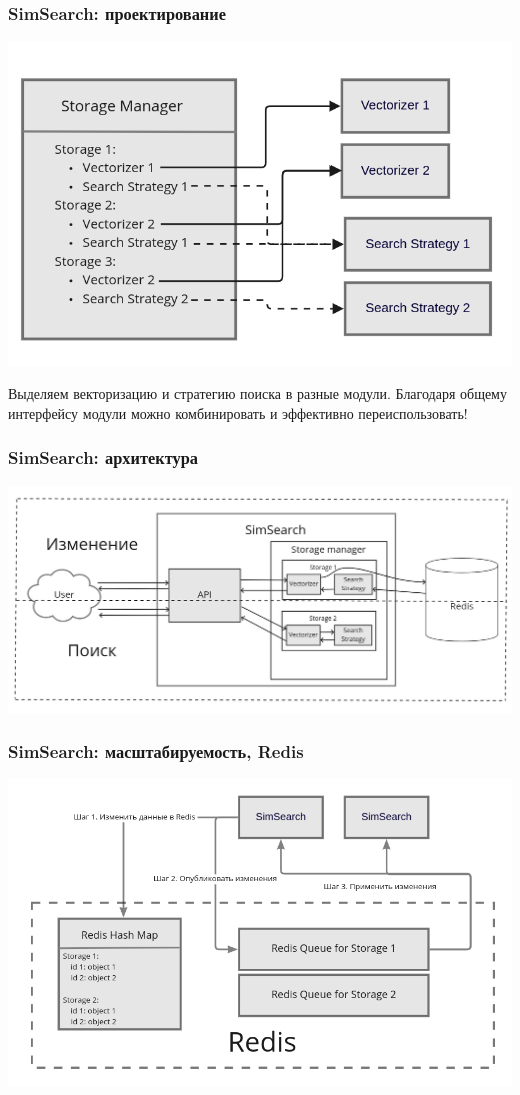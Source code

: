 \documentclass{beamer}
\begin{document}
\begin{frame}
\frametitle{SimSearch: проектирование}

\begin{center}
\includegraphics[width=0.7\linewidth]{img/miro_3.png}
\end{center}

Выделяем векторизацию и стратегию поиска в разные модули. Благодаря общему интерфейсу модули можно комбинировать и эффективно переиспользовать!

\end{frame}
\begin{frame}
\frametitle{SimSearch: архитектура}

\begin{center}
\includegraphics[width=\linewidth]{img/miro_4.png}
\end{center}

\end{frame}

\begin{frame}
\frametitle{SimSearch: масштабируемость, Redis}

\begin{center}
\includegraphics[width=\linewidth]{img/miro_1.png}
\end{center}

\end{frame}
\end{document}

